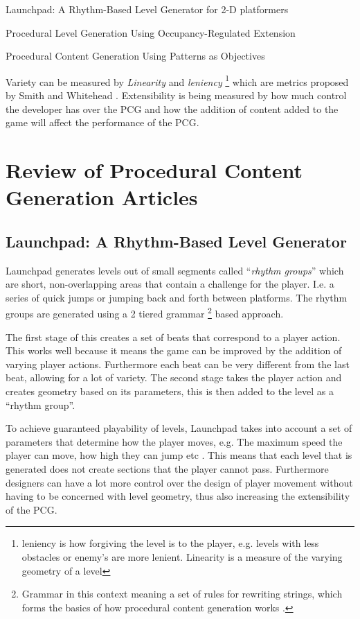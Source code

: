 \documentclass{scrartcl}
\begin{document}
Launchpad: A Rhythm-Based Level Generator for 2-D platformers \cite{smith2009} \par

Procedural Level Generation Using Occupancy-Regulated Extension \cite{mawhorter2010} \par

Procedural Content Generation Using Patterns as Objectives \cite{dahlskog2014} \par

Variety can be measured by \textit{Linearity} and \textit{leniency} \footnote{leniency is how forgiving the level is to the player, e.g. levels with less obstacles or enemy's are more lenient. Linearity is a measure of the varying geometry of a level} which are metrics proposed by Smith and Whitehead \cite{smith2010}. Extensibility is being measured by how much control the developer has over the PCG and how the addition of content added to the game will affect the performance of the PCG.


\section{Review of Procedural Content Generation Articles}

\subsection{Launchpad: A Rhythm-Based Level Generator}

Launchpad generates levels out of small segments called ``\textit{rhythm groups}''  which are short, non-overlapping areas that contain a challenge for the player. I.e. a series of quick jumps or jumping back and forth between platforms. The rhythm groups are generated using a 2 tiered grammar \footnote{Grammar in this context meaning a set of rules for rewriting strings, which forms the basics of how procedural content generation works \cite{shaker2015}.} based approach.

The first stage of this creates a set of beats that correspond to a player action. This works well because it means the game can be improved by the addition of varying player actions. Furthermore each beat can be very different from the last beat, allowing for a lot of variety.
The second stage takes the player action and creates geometry based on its parameters, this is then added to the level as a ``rhythm group''. 

To achieve guaranteed playability of levels, Launchpad takes into account a set of parameters that determine how the player moves, e.g. The maximum speed the player can move, how high they can jump etc \cite{smith2012web}. This means that each level that is generated does not create sections that the player cannot pass. Furthermore designers can have a lot more control over the design of player movement without having to be concerned with level geometry, thus also increasing the extensibility of the PCG.
\end{document}
